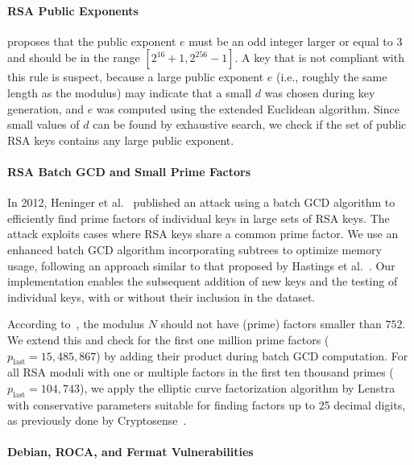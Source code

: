 \paragraph{RSA Public Exponents}

\cite[Section 6.1.6]{ca-browser-forum-2.1.2} proposes that the public exponent $e$ must be an odd integer larger or equal to $3$ and should be in the range $[2^{16}+1,2^{256}-1]$. A key that is not compliant with this rule is suspect, because a large public exponent $e$ (i.e., roughly the same length as the modulus) may indicate that a small $d$ was chosen during key generation, and $e$ was computed using the extended Euclidean algorithm.
Since small values of $d$ can be found by exhaustive search, we check if the set of public RSA keys contains any large public exponent.

\paragraph{RSA Batch GCD and Small Prime Factors}

In 2012, Heninger et al.~\cite{USENIX:HDWH12} published an attack using a batch GCD algorithm to efficiently find prime factors of individual keys in large sets of RSA keys. The attack exploits cases where RSA keys share a common prime factor. We use an enhanced batch GCD algorithm incorporating subtrees to optimize memory usage, following an approach similar to that proposed by Hastings et al.~\cite{hastings2016}. Our implementation enables the subsequent addition of new keys and the testing of individual keys, with or without their inclusion in the dataset.

According to~\cite[Section 6.1.6]{ca-browser-forum-2.1.2}, the modulus $N$ should not have (prime) factors smaller than $752$. We extend this and check for the first one million prime factors ($p_\text{last}=15{,}485{,}867$) by adding their product during batch GCD computation. For all RSA moduli with one or multiple factors in the first ten thousand primes ($p_\text{last} = 104{,}743$), we apply the elliptic curve factorization algorithm by Lenstra~\cite{lenstra1987factoring} with conservative parameters suitable for finding factors up to 25 decimal digits, as previously done by Cryptosense~\cite{cryptosense2015}.

\paragraph{Debian, ROCA, and Fermat Vulnerabilities}

